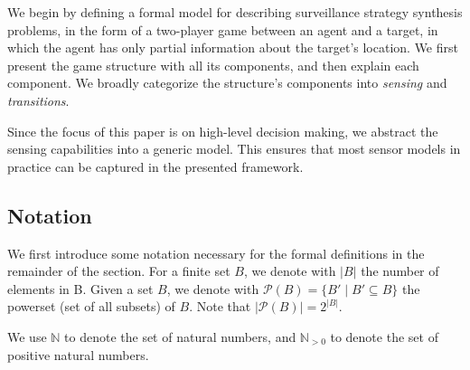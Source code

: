 We begin by defining a formal model for describing surveillance strategy synthesis problems, in the form of a two-player game between an agent and a target, in which the agent has only partial information about the target's location. We first present the game structure with all its components, and then explain each component. We broadly categorize the structure's components into \emph{sensing} and \emph{transitions}. 

Since the focus of this paper is on high-level decision making, we abstract the sensing capabilities into a generic model. This ensures that most sensor models in practice can be captured in the presented framework. 

\subsection{Notation}\label{sec:notation}
We first introduce some notation necessary for the formal definitions in the remainder of the section. For a finite set $B$, we denote with $|B|$ the number of elements in B. Given a set $B$, we denote with $\mathcal{P}(B) = \{B' \mid B'\subseteq B\}$ the powerset (set of all subsets) of $B$. Note that $|\mathcal{P}(B)|=2^{|B|}$. 

We use $\mathbb N$ to denote the set of natural numbers, and $\mathbb N_{>0}$ to denote the set of positive natural numbers.


